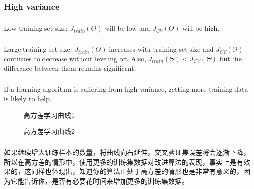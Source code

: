 \documentclass{article}
\begin{document}
\begin{CJK}{UTF8}{gbsn}
\subsubsection{High variance}
\subparagraph{}
Low training set size: $J_{train}(\Theta)$ will be low and $J_{CV}(\Theta)$ will be high.
\subparagraph{}
Large training set size: $J_{train}(\Theta)$ increases with training set size and $J_{CV}(\Theta)$ continues to decrease without leveling off. Also, $J_{train}(\Theta)<{J_{CV}(\Theta)}$ but the difference between them remains significant.
\subparagraph{}
If a learning algorithm is suffering from high variance, getting more training data is likely to help.
\begin{figure}[H]
\label{fig:641}
\caption{高方差学习曲线1}
\end{figure}
\begin{figure}[H]
\label{fig:637}
\caption{高方差学习曲线2}
\end{figure}
\subparagraph{}
如果继续增大训练样本的数量，将曲线向右延伸，交叉验证集误差将会逐渐下降，所以在高方差的情形中，使用更多的训练集数据对改进算法的表现，事实上是有效果的，这同样也体现出，知道你的算法正处于高方差的情形也是非常有意义的，因为它能告诉你，是否有必要花时间来增加更多的训练集数据。
\subparagraph{}
\begin{figure}[H]
\label{fig:638}
\end{figure}

\end{CJK}
\end{document}
